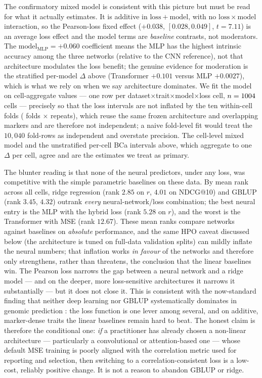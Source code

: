 The confirmatory mixed model is consistent with this picture but must be read for
what it actually estimates. It is additive in $\mathrm{loss}+\mathrm{model}$,
with no $\mathrm{loss}\times\mathrm{model}$ interaction, so the
Pearson-loss fixed effect ($+0.038$, $[0.028,0.049]$, $t=7.11$) is an average loss
effect and the model terms are \emph{baseline} contrasts, not moderators. The
$\mathrm{model}_{\mathrm{MLP}}=+0.060$ coefficient means the MLP has the highest
intrinsic accuracy among the three networks (relative to the CNN reference), not
that architecture modulates the loss benefit; the genuine evidence for moderation
is the stratified per-model $\Delta$ above (Transformer $+0.101$ versus MLP
$+0.0027$), which is what we rely on when we say architecture dominates. We fit the
model on cell-aggregate values --- one row per dataset$\times$trait$\times$model$
\times$loss cell, $n=1004$ cells --- precisely so that the loss intervals are
not inflated by the ten within-cell folds ( folds $\times$  repeats),
which reuse the same frozen architecture and overlapping markers and are therefore
not independent; a naive fold-level fit would treat the $10{,}040$ fold-rows as
independent and overstate precision. The cell-level mixed model and the unstratified
per-cell BCa intervals above, which aggregate to one $\Delta$ per cell, agree and
are the estimates we treat as primary.

The blunter reading is that none of the neural predictors, under any loss, was
competitive with the simple parametric baselines on these data. By mean rank
across all cells, ridge regression (rank $2.85$ on $r$, $4.01$ on NDCG@10) and
GBLUP (rank $3.45$, $4.32$) outrank \emph{every} neural-network/loss combination;
the best neural entry is the MLP with the hybrid loss (rank $5.28$ on $r$), and the
worst is the Transformer with MSE (rank $12.67$). These mean ranks compare
networks against baselines on \emph{absolute} performance, and the same HPO caveat
discussed below (the architecture is tuned on full-data validation splits) can
mildly inflate the neural numbers; that inflation works \emph{in favour} of the
networks and therefore only strengthens, rather than threatens, the conclusion
that the linear baselines win. The Pearson loss narrows the gap between a neural
network and a ridge model --- and on the deeper, more loss-sensitive
architectures it narrows it substantially --- but it does not close it. This is
consistent with the now-standard finding that neither deep learning nor GBLUP
systematically dominates in genomic prediction
\citep{montesinos2025dlgblup,montesinos2021power}: the loss function is one lever
among several, and on additive, marker-dense traits the linear baselines remain
hard to beat. The honest claim is therefore the conditional one: \emph{if} a
practitioner has already chosen a non-linear architecture --- particularly a
convolutional or attention-based one --- whose default MSE training is poorly
aligned with the correlation metric used for reporting and selection, then
switching to a correlation-consistent loss is a low-cost, reliably positive
change. It is not a reason to abandon GBLUP or ridge.

